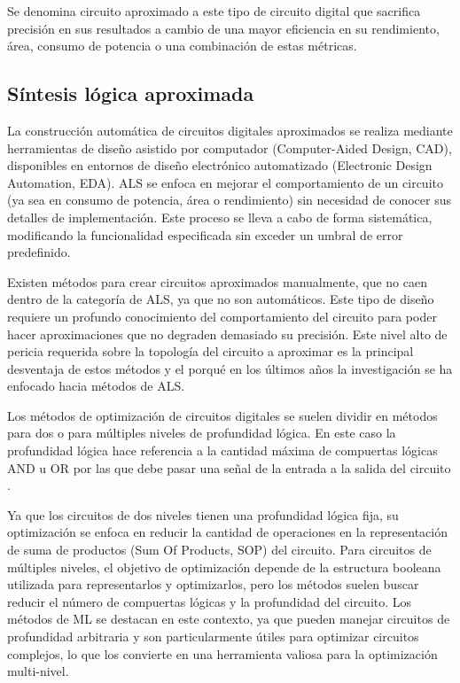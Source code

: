 Se denomina circuito aproximado a este tipo de circuito digital que sacrifica
precisión en sus resultados a cambio de una mayor eficiencia en su rendimiento,
área, consumo de potencia o una combinación de estas métricas.

\subsection{Síntesis lógica aproximada}

La construcción automática de circuitos digitales aproximados se realiza
mediante herramientas de diseño asistido por computador (Computer-Aided Design,
CAD), disponibles en entornos de diseño electrónico automatizado (Electronic
Design Automation, EDA). ALS se enfoca en mejorar el comportamiento de un
circuito (ya sea en consumo de potencia, área o rendimiento) sin necesidad de
conocer sus detalles de implementación. Este proceso se lleva a cabo de forma
sistemática, modificando la funcionalidad especificada sin exceder un umbral de
error predefinido. \cite{ammes_two-level_2022}

Existen métodos para crear circuitos aproximados manualmente, que no caen
dentro de la categoría de ALS, ya que no son automáticos. Este tipo de diseño
requiere un profundo conocimiento del comportamiento del circuito para poder
hacer aproximaciones que no degraden demasiado su precisión. Este nivel alto de
pericia requerida sobre la topología del circuito a aproximar es la principal
desventaja de estos métodos y el porqué en los últimos años la investigación se
ha enfocado hacia métodos de ALS.
\cite{ammes_two-level_2022}

Los métodos de optimización de circuitos digitales se suelen dividir en métodos
para dos o para múltiples niveles de profundidad lógica. En este caso la
profundidad lógica hace referencia a la cantidad máxima de compuertas lógicas
AND u OR por las que debe pasar una señal de la entrada a la salida del
circuito \cite{barr_investigation_1960}.

Ya que los circuitos de dos niveles tienen una profundidad lógica fija, su
optimización se enfoca en reducir la cantidad de operaciones en la
representación de suma de productos (Sum Of Products, SOP) del circuito. Para
circuitos de múltiples niveles, el objetivo de optimización depende de la
estructura booleana utilizada para representarlos y optimizarlos, pero los
métodos suelen buscar reducir el número de compuertas lógicas y la profundidad
del circuito. Los métodos de ML se destacan en este contexto, ya que pueden
manejar circuitos de profundidad arbitraria y son particularmente útiles para
optimizar circuitos complejos, lo que los convierte en una herramienta valiosa
para la optimización multi-nivel. \cite{ammes_two-level_2022}

